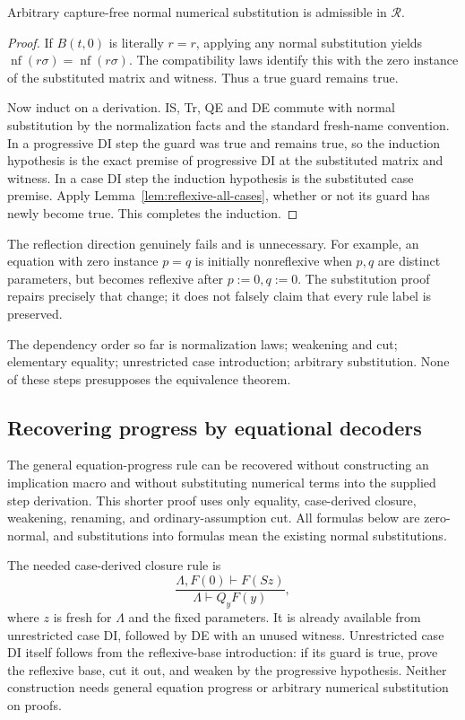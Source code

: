 \begin{lemma}
\label{lem:reflexive-substitution}
Arbitrary capture-free normal numerical substitution is admissible in
$\mathcal R$.
\end{lemma}
\begin{proof}
If $B(t,0)$ is literally $r=r$, applying any normal substitution yields
$\operatorname{nf}(r\sigma)=\operatorname{nf}(r\sigma)$.
The compatibility laws identify this with the zero instance of the
substituted matrix and witness.  Thus a true guard remains true.

Now induct on a derivation.  IS, Tr, QE and DE commute with normal
substitution by the normalization facts and the standard fresh-name
convention.  In a progressive DI step the guard was true and remains
true, so the induction hypothesis is the exact premise of progressive
DI at the substituted matrix and witness.  In a case DI step the
induction hypothesis is the substituted case premise.  Apply
Lemma~\ref{lem:reflexive-all-cases}, whether or not its guard has newly
become true.  This completes the induction.
\end{proof}

The reflection direction genuinely fails and is unnecessary.  For
example, an equation with zero instance $p=q$ is initially nonreflexive
when $p,q$ are distinct parameters, but becomes reflexive after
$p:=0,q:=0$.  The substitution proof repairs precisely that change;
it does not falsely claim that every rule label is preserved.

The dependency order so far is normalization laws; weakening and cut;
elementary equality; unrestricted case introduction; arbitrary
substitution.  None of these steps presupposes the equivalence theorem.

\subsection{Recovering progress by equational decoders}
\label{sec:equational-decoders}

The general equation-progress rule can be recovered without constructing
an implication macro and without substituting numerical terms into the
supplied step derivation.  This shorter proof uses only equality,
case-derived closure, weakening, renaming, and ordinary-assumption cut.
All formulas below are zero-normal, and substitutions into formulas mean
the existing normal substitutions.

The needed case-derived closure rule is
\begin{equation}
 \frac{\Lambda,F(0)\vdash F(Sz)}{\Lambda\vdash Q_yF(y)},
 \label{eq:decoder-qcase}
\end{equation}
where $z$ is fresh for $\Lambda$ and the fixed parameters.  It is already
available from unrestricted case DI, followed by DE with an unused
witness.  Unrestricted case DI itself follows from the reflexive-base
introduction: if its guard is true, prove the reflexive base, cut it out,
and weaken by the progressive hypothesis.  Neither construction needs
general equation progress or arbitrary numerical substitution on proofs.

